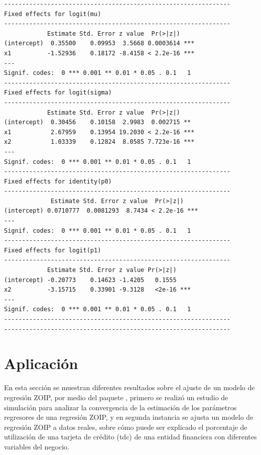 \begin{verbatim}
---------------------------------------------------------------
Fixed effects for logit(mu)
---------------------------------------------------------------
            Estimate Std. Error z value  Pr(>|z|)    
(intercept)  0.35500    0.09953  3.5668 0.0003614 ***
x1          -1.52936    0.18172 -8.4158 < 2.2e-16 ***
---
Signif. codes:  0 *** 0.001 ** 0.01 * 0.05 . 0.1   1
---------------------------------------------------------------
Fixed effects for logit(sigma)
---------------------------------------------------------------
            Estimate Std. Error z value  Pr(>|z|)    
(intercept)  0.30456    0.10158  2.9983  0.002715 ** 
x1           2.67959    0.13954 19.2030 < 2.2e-16 ***
x2           1.03339    0.12824  8.0585 7.723e-16 ***
---
Signif. codes:  0 *** 0.001 ** 0.01 * 0.05 . 0.1   1
---------------------------------------------------------------
Fixed effects for identity(p0)
---------------------------------------------------------------
             Estimate Std. Error z value  Pr(>|z|)    
(intercept) 0.0710777  0.0081293  8.7434 < 2.2e-16 ***
---
Signif. codes:  0 *** 0.001 ** 0.01 * 0.05 . 0.1   1
---------------------------------------------------------------
Fixed effects for logit(p1)
---------------------------------------------------------------
            Estimate Std. Error z value Pr(>|z|)    
(intercept) -0.20773    0.14623 -1.4205   0.1555    
x2          -3.15715    0.33901 -9.3128   <2e-16 ***
---
Signif. codes:  0 *** 0.001 ** 0.01 * 0.05 . 0.1   1
---------------------------------------------------------------
---------------------------------------------------------------
\end{verbatim}



\section{Aplicaci\'{o}n}
En esta secci\'{o}n se muestran diferentes resultados sobre el ajuste de un modelo de regresi\'{o}n ZOIP, por medio del paquete , primero se realiz\'{o} un estudio de simulaci\'{o}n para analizar la convergencia de la estimaci\'{o}n de los par\'{a}metros regresores de una regresi\'{o}n ZOIP, y en segunda instancia se ajusta un modelo de regresi\'{o}n ZOIP a datos reales, sobre c\'{o}mo puede ser explicado el porcentaje de utilizaci\'{o}n de una tarjeta de cr\'{e}dito (tdc) de una entidad financiera con diferentes variables del negocio.

